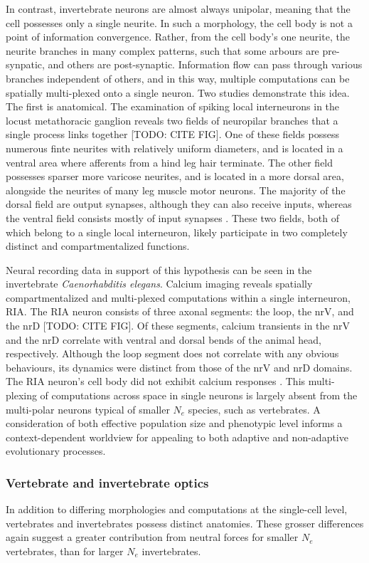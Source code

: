 \documentclass[twocolumn]{article}
\begin{document}
In contrast, invertebrate neurons are almost always unipolar, meaning that the cell possesses only a single neurite. In such a morphology, the cell body is not a point of information convergence. Rather, from the cell body's one neurite, the neurite branches in many complex patterns, such that some arbours are pre-synpatic, and others are post-synaptic. Information flow can pass through various branches independent of others, and in this way, multiple computations can be spatially multi-plexed onto a single neuron. Two studies demonstrate this idea. The first is anatomical. The examination of spiking local interneurons in the locust metathoracic ganglion reveals two fields of neuropilar branches that a single process links together [TODO: CITE FIG]. One of these fields possess numerous finte neurites with relatively uniform diameters, and is located in a ventral area where afferents from a hind leg hair terminate. The other field possesses sparser more varicose neurites, and is located in a more dorsal area, alongside the neurites of many leg muscle motor neurons. The majority of the dorsal field are output synapses, although they can also receive inputs, whereas the ventral field consists mostly of input synapses \cite{watson_burrows_1985}. These two fields, both of which belong to a single local interneuron, likely participate in two completely distinct and compartmentalized functions. 

Neural recording data in support of this hypothesis can be seen in the invertebrate \textit{Caenorhabditis  elegans}. Calcium imaging reveals spatially compartmentalized and multi-plexed computations within a single interneuron, RIA. The RIA neuron consists of three axonal segments: the loop, the nrV, and the nrD [TODO: CITE FIG]. Of these segments, calcium transients in the nrV and the nrD correlate with ventral and dorsal bends of the animal head, respectively. Although the loop segment does not correlate with any obvious behaviours, its dynamics were distinct from those of the nrV and nrD domains. The RIA neuron's cell body did not exhibit calcium responses \cite{Hendricks_Ha_Maffey_Zhang_2012}. This multi-plexing of computations across space in single neurons is largely absent from the multi-polar neurons typical of smaller $N_e$ species, such as vertebrates. A consideration of both effective population size and phenotypic level informs a context-dependent worldview for appealing to both adaptive and non-adaptive evolutionary processes. 

\subsubsection{Vertebrate and invertebrate optics} 
In addition to differing morphologies and computations at the single-cell level, vertebrates and invertebrates possess distinct anatomies. These grosser differences again suggest a greater contribution from neutral forces for smaller $N_e$ vertebrates, than for larger $N_e$ invertebrates. 
\end{document}
